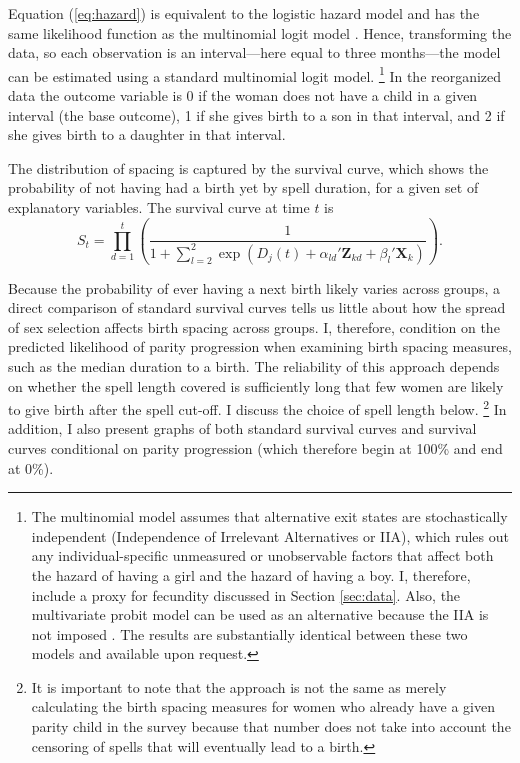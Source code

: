 \documentclass[12pt,letterpaper]{article}
\begin{document}
Equation (\ref{eq:hazard}) is equivalent to the logistic hazard model and has the same 
likelihood function as the multinomial logit model \citep{allison82,jenkins95}.
Hence, transforming the data, so each observation is an interval---here equal
to three months---the model can be estimated using a standard multinomial logit model.%
\footnote{
The multinomial model assumes that alternative exit states are stochastically independent
(Independence of Irrelevant Alternatives or IIA), which rules out any individual-specific 
unmeasured or unobservable factors that affect both the hazard of having a girl and the 
hazard of having a boy.
I, therefore, include a proxy for fecundity discussed in Section \ref{sec:data}.
Also, the multivariate probit model can be used as an alternative because the IIA is not 
imposed \citep{han90}.
The results are substantially identical between these two models and
available upon request.
}
In the reorganized data the outcome variable is 0 if the woman does not have a child in a 
given interval (the base outcome), 1 if she gives birth to a son in that interval, and 2 
if she gives birth to a daughter in that interval.

The distribution of spacing is captured by the survival curve, which shows the probability 
of not having had a birth yet by spell duration, for a given set of explanatory variables.
The survival curve at time $t$ is 
\begin{equation}
\label{eq:survival}
S_{t} 
= 
\prod_{d=1}^t
\left(
\frac{ 1 }
{1 + \sum_{l=2}^2 \exp(D_j(t) + \alpha_{ld}'\mathbf{Z}_{kd} + \beta_l'\mathbf{X}_{k})}
\right).
\end{equation}

Because the probability of ever having a next birth likely varies across groups, a direct 
comparison of standard survival curves tells us little about how the spread of sex selection 
affects birth spacing across groups.
I, therefore, condition on the predicted likelihood of parity progression when examining 
birth spacing measures, such as the median duration to a birth.
The reliability of this approach depends on whether the spell length covered is 
sufficiently long that few women are likely to give birth after the spell cut-off.
I discuss the choice of spell length below.%
\footnote{
It is important to note that the approach is not the same as merely calculating 
the birth spacing measures for women who already have a given 
parity child in the survey because that number does not take into account
the censoring of spells that will eventually lead to a birth.
}
In addition, I also present graphs of both standard survival curves and
survival curves conditional on parity progression (which therefore
begin at 100\% and end at 0\%).
\end{document}
